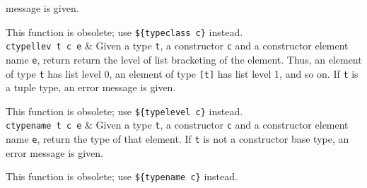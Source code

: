 \begin{desctab}
message is given.
\par
This function is obsolete; use \verb'${typeclass c}' instead.
\\
{\tt ctypellev t c e}
&
Given a type {\tt t}, a constructor {\tt c} and a constructor element name
{\tt e}, return return the level of list bracketing of the element. Thus,
an element of type \verb't' has list level 0, an element of type
\verb'[t]' has list level 1, and so on.  If {\tt t} is a tuple type,
an error message is given.
\par
This function is obsolete; use \verb'${typelevel c}' instead.
\\
{\tt ctypename t c e}
&
Given a type {\tt t},
a constructor {\tt c}
and a constructor element name {\tt e},
return the type of that element.
If {\tt t} is not a constructor base type, an error message is given.
\par
This function is obsolete; use \verb'${typename c}' instead.
\\
\end{desctab}
